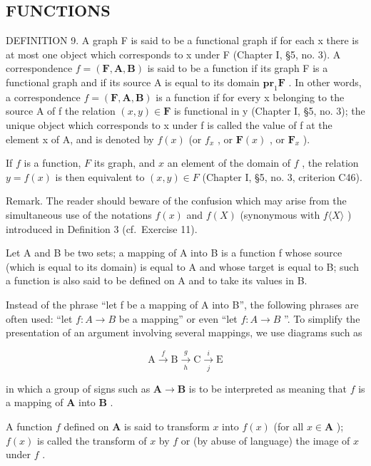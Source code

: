 \subsection{FUNCTIONS}

DEFINITION 9. A graph F is said to be a functional graph if for each x there is at most one object which corresponds to x under F (Chapter I, §5, no. 3). A correspondence \(f = (\mathbf{F}, \mathbf{A}, \mathbf{B})\) is said to be a function if its graph F is a functional graph and if its source A is equal to its domain \(\mathbf{pr}_1\mathbf{F}\) . In other words, a correspondence \(f = (\mathbf{F}, \mathbf{A}, \mathbf{B})\) is a function if for every x belonging to the source A of f the relation \((x, y) \in \mathbf{F}\) is functional in y (Chapter I, §5, no. 3); the unique object which corresponds to x under f is called the value of f at the element x of A, and is denoted by \(f(x)\) (or \(f_x\) , or \(\mathbf{F}(x)\) , or \(\mathbf{F}_x\) ).

If \(f\) is a function, \(F\) its graph, and \(x\) an element of the domain of \(f\) , the relation \(y = f(x)\) is then equivalent to \((x, y) \in F\) (Chapter I, §5, no. 3, criterion C46).

Remark. The reader should beware of the confusion which may arise from the simultaneous use of the notations \(f(x)\) and \(f(X)\) (synonymous with \(f\langle X\rangle\) ) introduced in Definition 3 (cf.~Exercise 11).

Let A and B be two sets; a mapping of A into B is a function f whose source (which is equal to its domain) is equal to A and whose target is equal to B; such a function is also said to be defined on A and to take its values in B.

Instead of the phrase ``let f be a mapping of A into B'', the following phrases are often used: ``let \(f: A \rightarrow B\) be a mapping'' or even ``let \(f: A \rightarrow B\) ''. To simplify the presentation of an argument involving several mappings, we use diagrams such as

\[
\mathrm{A} \xrightarrow {f} \mathrm{B} \xrightarrow [ h ]{g} \mathrm{C} \xrightarrow [ j ]{i} \mathrm{E}
\]

in which a group of signs such as \(\mathbf{A} \to \mathbf{B}\) is to be interpreted as meaning that \(f\) is a mapping of \(\mathbf{A}\) into \(\mathbf{B}\) .

A function \(f\) defined on \(\mathbf{A}\) is said to transform \(x\) into \(f(x)\) (for all \(x \in \mathbf{A}\) ); \(f(x)\) is called the transform of \(x\) by \(f\) or (by abuse of language) the image of \(x\) under \(f\) .

